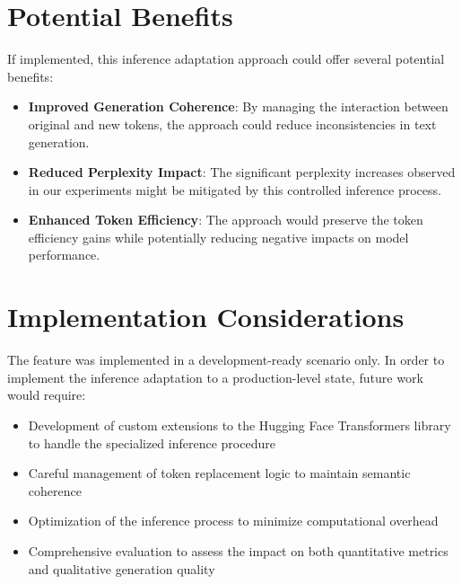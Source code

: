\section{Potential Benefits}
If implemented, this inference adaptation approach could offer several potential benefits:

\begin{itemize}
    \item \textbf{Improved Generation Coherence}: By managing the interaction between original and new tokens, the approach could reduce inconsistencies in text generation. 
    
    \item \textbf{Reduced Perplexity Impact}: The significant perplexity increases observed in our experiments might be mitigated by this controlled inference process. 
    
    \item \textbf{Enhanced Token Efficiency}: The approach would preserve the token efficiency gains while potentially reducing negative impacts on model performance. 
\end{itemize}

\section{Implementation Considerations}
The feature was implemented in a development-ready scenario only. In order to implement the inference adaptation to a production-level state, future work would require:

\begin{itemize}
    \item Development of custom extensions to the Hugging Face Transformers library to handle the specialized inference procedure
    
    \item Careful management of token replacement logic to maintain semantic coherence
    
    \item Optimization of the inference process to minimize computational overhead
    
    \item Comprehensive evaluation to assess the impact on both quantitative metrics and qualitative generation quality
\end{itemize}

